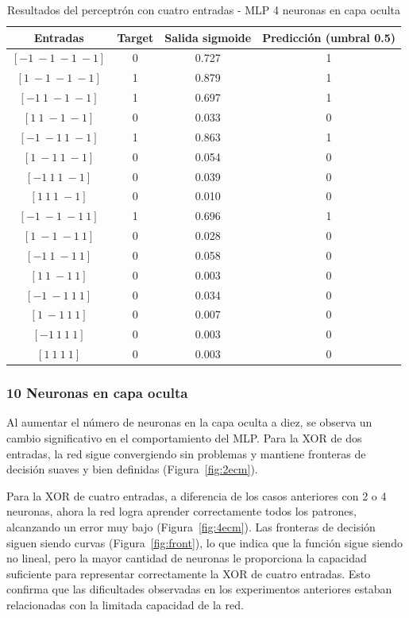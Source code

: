 \documentclass[11pt]{article} %
\begin{document}
\begin{table}[h!]
	\centering
	\begin{tabular}{cccc}
		\hline
		\textbf{Entradas} & \textbf{Target} & \textbf{Salida sigmoide} & \textbf{Predicción (umbral 0.5)} \\
		\hline
		$[-1\ -1\ -1\ -1]$ & 0 & 0.727 & 1 \\
		$[1\ -1\ -1\ -1]$ & 1 & 0.879 & 1 \\
		$[-1\ 1\ -1\ -1]$ & 1 & 0.697 & 1 \\
		$[1\ 1\ -1\ -1]$ & 0 & 0.033 & 0 \\
		$[-1\ -1\ 1\ -1]$ & 1 & 0.863 & 1 \\
		$[1\ -1\ 1\ -1]$ & 0 & 0.054 & 0 \\
		$[-1\ 1\ 1\ -1]$ & 0 & 0.039 & 0 \\
		$[1\ 1\ 1\ -1]$ & 0 & 0.010 & 0 \\
		$[-1\ -1\ -1\ 1]$ & 1 & 0.696 & 1 \\
		$[1\ -1\ -1\ 1]$ & 0 & 0.028 & 0 \\
		$[-1\ 1\ -1\ 1]$ & 0 & 0.058 & 0 \\
		$[1\ 1\ -1\ 1]$ & 0 & 0.003 & 0 \\
		$[-1\ -1\ 1\ 1]$ & 0 & 0.034 & 0 \\
		$[1\ -1\ 1\ 1]$ & 0 & 0.007 & 0 \\
		$[-1\ 1\ 1\ 1]$ & 0 & 0.003 & 0 \\
		$[1\ 1\ 1\ 1]$ & 0 & 0.003 & 0 \\
		\hline
	\end{tabular}
	\caption{Resultados del perceptrón con cuatro entradas - MLP 4 neuronas en capa oculta}
\end{table}

\clearpage

\subsubsection{10 Neuronas en capa oculta}

Al aumentar el número de neuronas en la capa oculta a diez, se observa un cambio significativo en el comportamiento del MLP.
Para la XOR de dos entradas, la red sigue convergiendo sin problemas y mantiene fronteras de decisión suaves y bien definidas (Figura~\ref{fig:2ecm}).

Para la XOR de cuatro entradas, a diferencia de los casos anteriores con 2 o 4 neuronas, ahora la red logra aprender correctamente todos los patrones, alcanzando un error muy bajo (Figura~\ref{fig:4ecm}).
Las fronteras de decisión siguen siendo curvas (Figura~\ref{fig:front}), lo que indica que la función sigue siendo no lineal, pero la mayor cantidad de neuronas le proporciona la capacidad suficiente para representar correctamente la XOR de cuatro entradas.
Esto confirma que las dificultades observadas en los experimentos anteriores estaban relacionadas con la limitada capacidad de la red.
\end{document}

